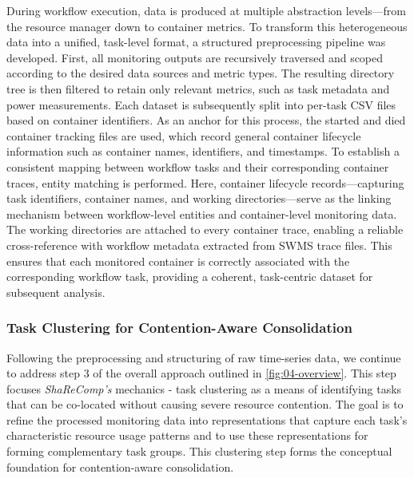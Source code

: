 During workflow execution, data is produced at multiple abstraction levels—from the resource manager down to container metrics. To transform this heterogeneous data into a unified, task-level format, a structured preprocessing pipeline was developed. First, all monitoring outputs are recursively traversed and scoped according to the desired data sources and metric types. The resulting directory tree is then filtered to retain only relevant metrics, such as task metadata and power measurements. Each dataset is subsequently split into per-task CSV files based on container identifiers.
As an anchor for this process, the started and died container tracking files are used, which record general container lifecycle information such as container names, identifiers, and timestamps. To establish a consistent mapping between workflow tasks and their corresponding container traces, entity matching is performed. Here, container lifecycle records—capturing task identifiers, container names, and working directories—serve as the linking mechanism between workflow-level entities and container-level monitoring data. The working directories are attached to every container trace, enabling a reliable cross-reference with workflow metadata extracted from SWMS trace files. This ensures that each monitored container is correctly associated with the corresponding workflow task, providing a coherent, task-centric dataset for subsequent analysis.

\subsubsection{Task Clustering for Contention-Aware Consolidation}
\label{sec:task_clustering}

Following the preprocessing and structuring of raw time-series data, we continue to address step 3 of the overall approach outlined in \ref{fig:04-overview}. This step focuses \textit{ShaReComp's} mechanics - task clustering as a means of identifying tasks that can be co-located without causing severe resource contention. The goal is to refine the processed monitoring data into representations that capture each task's characteristic resource usage patterns and to use these representations for forming complementary task groups. This clustering step forms the conceptual foundation for contention-aware consolidation.

\label{sec:data_preprocessing_clustering}

